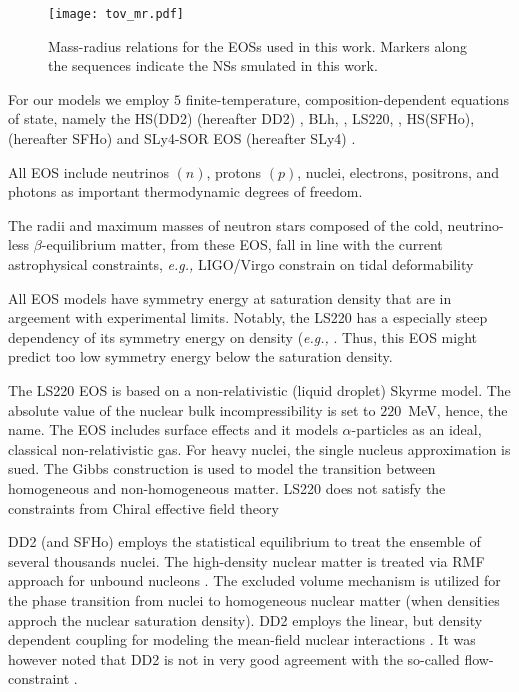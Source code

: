 \begin{figure}[t]
    \centering 
    \texttt{[image: tov\_mr.pdf]}
    \caption{Mass-radius relations for the EOSs used in this work. 
        Markers along the sequences indicate the NSs smulated in this work.}  
    \label{fig:method:tov_mr}
\end{figure}

For our models we employ $5$ finite-temperature, composition-dependent equations of state, namely the 
HS(DD2) (hereafter DD2) \cite{Typel:2009sy,Hempel:2009mc}, 
BLh, \cite{Bombaci:2018ksa}, 
LS220, \cite{Lattimer:1991nc}, 
HS(SFHo), (hereafter SFHo) \cite{Steiner:2012rk} and 
SLy4-SOR EOS (hereafter SLy4) \cite{daSilvaSchneider:2017jpg}.

All EOS include neutrinos $(n)$, protons $(p)$, nuclei, electrons, positrons, and photons
as important thermodynamic degrees of freedom.

The radii and maximum masses of neutron stars composed of the cold, neutrino-less $\beta$-equilibrium matter,
from these EOS, fall in line with the current astrophysical constraints, 
\textit{e.g.,} LIGO/Virgo constrain on tidal deformability 
\citep{TheLIGOScientific:2017qsa,Abbott:2018wiz,De:2018uhw,Abbott:2018exr}

All EOS models have symmetry energy at saturation density that are in argeement with experimental limits.
Notably, the LS220 has a especially steep dependency of its symmetry energy on density (\textit{e.g.,} \cite{Lattimer:2012xj,Danielewicz:2013upa}. Thus, this EOS might predict too low symmetry energy below the saturation density. 

The LS220 EOS is based on a non-relativistic (liquid droplet) Skyrme model.
The absolute value of the nuclear bulk incompressibility is set to $220$~MeV, hence, the name.
The EOS includes surface effects and it models $\alpha$-particles as an ideal, classical
non-relativistic gas. For heavy nuclei, the single nucleus approximation is sued. 
The Gibbs construction is used to model the transition between homogeneous and non-homogeneous matter.
LS220 does not satisfy the constraints from Chiral effective field theory \cite{Hempel:2017ikt}

DD2 (and SFHo) employs the statistical equilibrium to treat the ensemble of several thousands nuclei.
The high-density nuclear matter is treated via RMF approach for unbound nucleons \cite{Hempel:2009mc}.
The excluded volume mechanism is utilized for the phase transition from nuclei to homogeneous
nuclear matter (when densities approch the nuclear saturation density).
DD2 employs the linear, but density dependent coupling for modeling the mean-field nuclear interactions \cite{Typel:2009sy}.
It was however noted that DD2 is not in very good agreement with the so-called flow-constraint \cite{Danielewicz:2002pu}.

